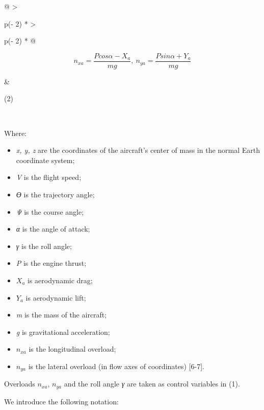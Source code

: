 \begin{longtable}[]{@{}
  >{\raggedright\arraybackslash}p{(\columnwidth - 2\tabcolsep) * }
  >{\raggedright\arraybackslash}p{(\columnwidth - 2\tabcolsep) * }@{}}

\begin{minipage}[b]{\linewidth}\raggedright
\[n_{xa} = \frac{Pcos\alpha - X_{a}}{mg},\ n_{ya} = \frac{Psin\alpha + Y_{a}}{mg}\]
\end{minipage} & \begin{minipage}[b]{\linewidth}\raggedright
(2)
\end{minipage} \\
\end{longtable}

\begin{multicols}{2}

Where:

\begin{minipage}[t]{0.45\textwidth}
  \begin{itemize}
    \setlength{\itemindent}{1cm}
    \item \emph{x, y, z} are the coordinates of the aircraft’s center of mass in the normal Earth coordinate system;
    \item \emph{V} is the flight speed;
    \item \emph{ϴ} is the trajectory angle;
    \item \emph{Ψ} is the course angle;
    \item \emph{α} is the angle of attack;
    \item \emph{γ} is the roll angle;
    \item \emph{P} is the engine thrust;
  \end{itemize}
  \end{minipage}%
  \hfill
  \begin{minipage}[t]{0.45\textwidth}
  \begin{itemize}
    \setlength{\itemindent}{1cm}
    
    \item \(X_{a}\) is aerodynamic drag;
    \item \(Y_{a}\) is aerodynamic lift;
    \item \emph{m} is the mass of the aircraft;
    \item \emph{g} is gravitational acceleration;
    \item \(n_{xa}\) is the longitudinal overload;
    \item \(n_{ya}\) is the lateral overload (in flow axes of coordinates) {[}6-7{]}.
  \end{itemize}
  \end{minipage}
  





Overloads \(n_{xa}\), \(n_{ya}\) and the roll angle \emph{γ} are taken
as control variables in (1).

\newpage

We introduce the following notation:

\end{multicols}
